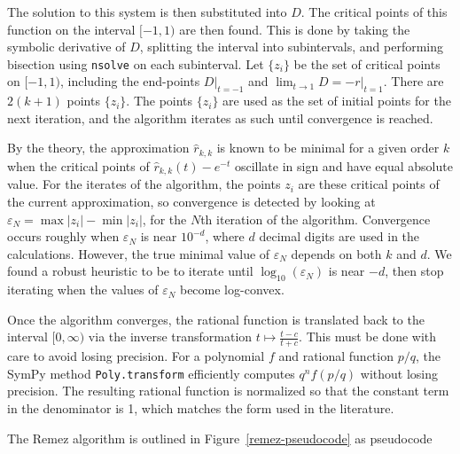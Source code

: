 The solution to this system is then substituted into $D$. The critical points
of this function on the interval $[-1, 1)$ are then found. This is done by
taking the symbolic derivative of $D$, splitting the interval into
subintervals, and performing bisection using \texttt{nsolve} on each
subinterval. Let $\{z_i\}$ be the set of critical points on $[-1, 1)$,
including the end-points $D|_{t=-1}$ and $\lim_{t\to 1} D=-r|_{t=1}$. There
are $2(k+1)$ points $\{z_i\}$. The points $\{z_i\}$ are used as the set of
initial points for the next iteration, and the algorithm iterates as such
until convergence is reached.

By the theory, the approximation $\hat{r}_{k, k}$ is known to be minimal for a
given order $k$ when the critical points of $\hat{r}_{k, k}(t) - e^{-t}$
oscillate in sign and have equal absolute value. For the iterates of the
algorithm, the points $z_i$ are these critical points of the current
approximation, so convergence is detected by looking at
$\varepsilon_N = \max{|z_i|} - \min{|z_i|}$, for the $N$th iteration of the
algorithm. Convergence occurs roughly when $\varepsilon_N$ is near $10^{-d}$,
where $d$ decimal digits are used in the calculations. However, the true
minimal value of $\varepsilon_N$ depends on both $k$ and $d$. We found a
robust heuristic to be to iterate until $\log_{10}{(\varepsilon_N)}$ is near $-d$,
then stop iterating when the values of $\varepsilon_N$ become log-convex.

Once the algorithm converges, the rational function is translated back to the
interval $[0, \infty)$ via the inverse transformation $t\mapsto \frac{t - c}{t
  + c}$. This must be done with care to avoid losing precision. For a
polynomial $f$ and rational function $p/q$, the SymPy
method \texttt{Poly.transform} efficiently computes
$q^nf\left(p/q\right)$ without losing precision. The resulting
rational function is normalized so that the constant term in the denominator
is 1, which matches the form used in the literature.~\cite{ationneeded}

The Remez algorithm is outlined in Figure~\ref{remez-pseudocode} as pseudocode

